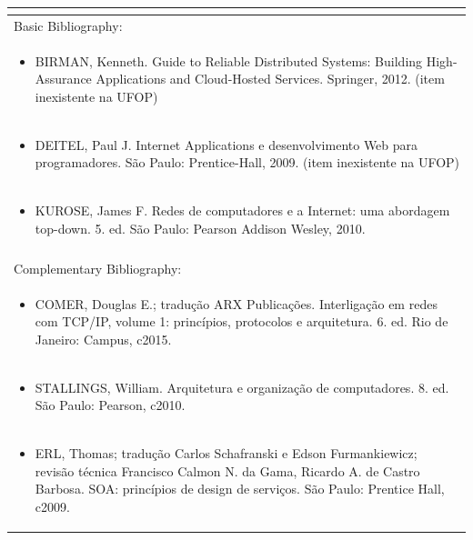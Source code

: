 \documentclass[11pt]{article}
\begin{document}
\begin{center}
\begin{longtable}{|p{4cm}|p{4cm}|p{4cm}|p{4cm}|}
\multicolumn{4}{|p{\dimexpr 16cm + 6\tabcolsep\relax}|}{}\\
\hline
\multicolumn{4}{|p{16cm}|}{Basic Bibliography:}\\*
\multicolumn{4}{|p{\dimexpr 16cm + 6\tabcolsep\relax}|}{\begin{itemize}\item BIRMAN, Kenneth. Guide to Reliable Distributed Systems: Building High-Assurance Applications and Cloud-Hosted Services. Springer, 2012. (item inexistente na UFOP)\end{itemize}}\\
\multicolumn{4}{|p{\dimexpr 16cm + 6\tabcolsep\relax}|}{\begin{itemize}\item DEITEL, Paul J. Internet Applications e desenvolvimento Web para programadores. São Paulo: Prentice-Hall, 2009. (item inexistente na UFOP)\end{itemize}}\\
\multicolumn{4}{|p{\dimexpr 16cm + 6\tabcolsep\relax}|}{\begin{itemize}\item KUROSE, James F. Redes de computadores e a Internet: uma abordagem top-down. 5. ed. São Paulo: Pearson Addison Wesley, 2010.\end{itemize}}\\
\multicolumn{4}{|p{16cm}|}{}\\
\hline
\multicolumn{4}{|p{16cm}|}{Complementary Bibliography:}\\*
\multicolumn{4}{|p{\dimexpr 16cm + 6\tabcolsep\relax}|}{\begin{itemize}\item COMER, Douglas E.; tradução ARX Publicações. Interligação em redes com TCP/IP, volume 1: princípios, protocolos e arquitetura. 6. ed. Rio de Janeiro: Campus, c2015.\end{itemize}}\\
\multicolumn{4}{|p{\dimexpr 16cm + 6\tabcolsep\relax}|}{\begin{itemize}\item STALLINGS, William. Arquitetura e organização de computadores. 8. ed. São Paulo: Pearson, c2010.\end{itemize}}\\
\multicolumn{4}{|p{\dimexpr 16cm + 6\tabcolsep\relax}|}{\begin{itemize}\item ERL, Thomas; tradução Carlos Schafranski e Edson Furmankiewicz; revisão técnica Francisco Calmon N. da Gama, Ricardo A. de Castro Barbosa. SOA: princípios de design de serviços. São Paulo: Prentice Hall, c2009.\end{itemize}}\\

\end{longtable}
\end{center}
\end{document}

